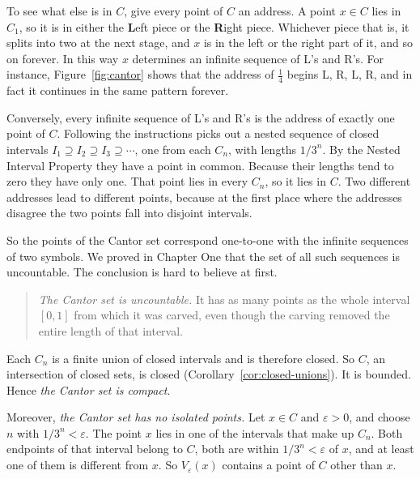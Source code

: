   To see what else is in $C$, give every point of $C$ an address.  A point $x \in C$ lies in $C_1$, so it is in either the \textbf{L}eft piece or the \textbf{R}ight piece.  Whichever piece that is, it splits into two at the next stage, and $x$ is in the left or the right part of it, and so on forever.  In this way $x$ determines an infinite sequence of L's and R's.  For instance, Figure~\ref{fig:cantor} shows that the address of $\frac14$ begins L, R, L, R, and in fact it continues in the same pattern forever.

Conversely, every infinite sequence of L's and R's is the address of exactly one point of $C$.  Following the instructions picks out a nested sequence of closed intervals $I_1 \supseteq I_2 \supseteq I_3 \supseteq \cdots$, one from each $C_n$, with lengths $1/3^n$.  By the Nested Interval Property they have a point in common.  Because their lengths tend to zero they have only one.  That point lies in every $C_n$, so it lies in $C$.  Two different addresses lead to different points, because at the first place where the addresses disagree the two points fall into disjoint intervals.

So the points of the Cantor set correspond one-to-one with the infinite sequences of two symbols.  We proved in Chapter One that the set of all such sequences is uncountable.  The conclusion is hard to believe at first.

\begin{quote}
\emph{The Cantor set is uncountable.}  It has as many points as the whole interval $[0,1]$ from which it was carved, even though the carving removed the entire length of that interval.
\end{quote}


  Each $C_n$ is a finite union of closed intervals and is therefore closed.  So $C$, an intersection of closed sets, is closed (Corollary~\ref{cor:closed-unions}).  It is bounded.  Hence \emph{the Cantor set is compact}.

Moreover, \emph{the Cantor set has no isolated points.}  Let $x \in C$ and $\varepsilon > 0$, and choose $n$ with $1/3^n < \varepsilon$.  The point $x$ lies in one of the intervals that make up $C_n$.  Both endpoints of that interval belong to $C$, both are within $1/3^n < \varepsilon$ of $x$, and at least one of them is different from $x$.  So $V_{\varepsilon}(x)$ contains a point of $C$ other than $x$.

